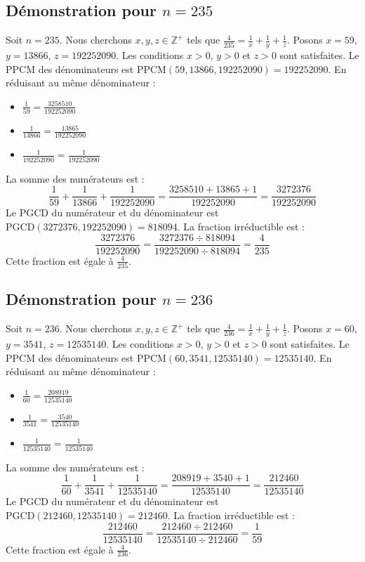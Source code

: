 \documentclass[11pt,a4paper]{article}
\begin{document}
\subsection{Démonstration pour $n = 235$}
Soit $n = 235$. Nous cherchons $x, y, z \in \mathbb{Z}^{+}$ tels que $\frac{4}{235} = \frac{1}{x} + \frac{1}{y} + \frac{1}{z}$.
Posons $x = 59$, $y = 13866$, $z = 192252090$.
Les conditions $x > 0$, $y > 0$ et $z > 0$ sont satisfaites.
Le PPCM des dénominateurs est $\text{PPCM}(59, 13866, 192252090) = 192252090$.
En réduisant au même dénominateur :
\begin{itemize}
    \item $\frac{1}{59} = \frac{3258510}{192252090}$
    \item $\frac{1}{13866} = \frac{13865}{192252090}$
    \item $\frac{1}{192252090} = \frac{1}{192252090}$
\end{itemize}
La somme des numérateurs est :
$$ \frac{1}{59} + \frac{1}{13866} + \frac{1}{192252090} = \frac{3258510 + 13865 + 1}{192252090} = \frac{3272376}{192252090} $$
Le PGCD du numérateur et du dénominateur est $\text{PGCD}(3272376, 192252090) = 818094$.
La fraction irréductible est :
$$ \frac{3272376}{192252090} = \frac{3272376 \div 818094}{192252090 \div 818094} = \frac{4}{235} $$
Cette fraction est égale à $\frac{4}{235}$.

\subsection{Démonstration pour $n = 236$}
Soit $n = 236$. Nous cherchons $x, y, z \in \mathbb{Z}^{+}$ tels que $\frac{4}{236} = \frac{1}{x} + \frac{1}{y} + \frac{1}{z}$.
Posons $x = 60$, $y = 3541$, $z = 12535140$.
Les conditions $x > 0$, $y > 0$ et $z > 0$ sont satisfaites.
Le PPCM des dénominateurs est $\text{PPCM}(60, 3541, 12535140) = 12535140$.
En réduisant au même dénominateur :
\begin{itemize}
    \item $\frac{1}{60} = \frac{208919}{12535140}$
    \item $\frac{1}{3541} = \frac{3540}{12535140}$
    \item $\frac{1}{12535140} = \frac{1}{12535140}$
\end{itemize}
La somme des numérateurs est :
$$ \frac{1}{60} + \frac{1}{3541} + \frac{1}{12535140} = \frac{208919 + 3540 + 1}{12535140} = \frac{212460}{12535140} $$
Le PGCD du numérateur et du dénominateur est $\text{PGCD}(212460, 12535140) = 212460$.
La fraction irréductible est :
$$ \frac{212460}{12535140} = \frac{212460 \div 212460}{12535140 \div 212460} = \frac{1}{59} $$
Cette fraction est égale à $\frac{4}{236}$.
\end{document}
